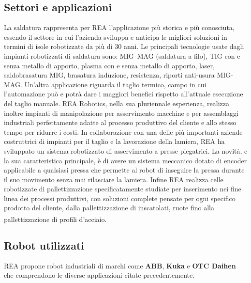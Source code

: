 \subsection{Settori e applicazioni}
La saldatura rappresenta per REA l'applicazione più storica e più conosciuta, essendo il settore in cui l'azienda sviluppa e anticipa le migliori soluzioni in termini di isole robotizzate da più di 30 anni. Le principali tecnologie usate dagli impianti robotizzati di saldatura sono: MIG–MAG (saldatura a filo), TIG con e senza metallo di apporto, plasma con e senza metallo di apporto, laser, saldobrasatura MIG, brasatura induzione, resistenza, riporti anti-usura MIG-MAG. Un'altra applicazione riguarda il taglio termico, campo in cui l'automazione può e potrà dare i maggiori benefici rispetto all'attuale esecuzione del taglio manuale. REA Robotics, nella sua pluriennale esperienza, realizza inoltre impianti di manipolazione per asservimento macchine e per assemblaggi industriali perfettamente adatte al processo produttivo del cliente e allo stesso tempo per ridurre i costi. In collaborazione con una delle più importanti aziende costruttrici di impianti per il taglio e la lavorazione della lamiera, REA ha sviluppato un sistema robotizzato di asservimento a presse piegatrici. La novità, e la sua caratteristica principale, è di avere un sistema meccanico dotato di encoder applicabile a qualsiasi pressa che permette al robot di inseguire la pressa durante il suo movimento senza mai rilasciare la lamiera. Infine REA realizza celle robotizzate di pallettizzazione specificatamente studiate per inserimento nei fine linea dei processi produttivi, con soluzioni complete pensate per ogni specifico prodotto del cliente, dalla pallettizzazione di inscatolati, ruote fino alla pallettizzazione di profili d'acciaio.\textsuperscript{\cite{spaziowebpdf}}

\subsection{Robot utilizzati}
REA propone robot industriali di marchi come \textbf{ABB}, \textbf{Kuka} e \textbf{OTC Daihen} che comprendono le diverse applicazioni citate precedentemente.